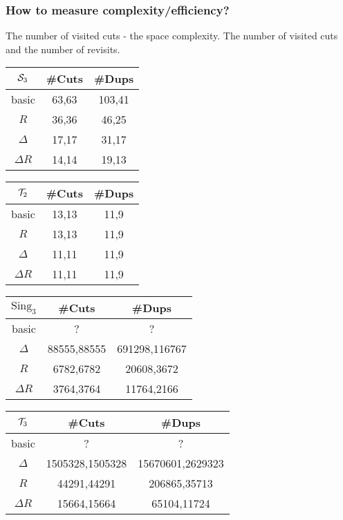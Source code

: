 \documentclass{beamer}
\newcommand{\cS}{{\cal S}}
\newcommand{\cT}{{\cal T}}
\newcommand{\jump}{\vskip6pt}
\begin{document}
\begin{frame}\frametitle{How to measure complexity/efficiency?}
The number of visited cuts - the space complexity.
\jump
The number of visited cuts and the number of revisits.
\jump
\begin{tabular}{c|cc}
$\cS_3$ & \#Cuts & \#Dups \\
\hline
basic  & 63,63 & 103,41\\
$R$ &36,36 & 46,25\\
$\Delta$ & 17,17 & 31,17 \\
$\Delta R$ & 14,14 & 19,13
\end{tabular}
\jump

\begin{tabular}{c|cc}
$\cT_2$ & \#Cuts & \#Dups \\
\hline
basic  & 13,13 & 11,9\\
$R$ &13,13 & 11,9\\
$\Delta$ & 11,11 & 11,9 \\
$\Delta R$ & 11,11 & 11,9
\end{tabular}
\end{frame}

\begin{frame}
\begin{tabular}{c|cc}
$\text{Sing}_3$ & \#Cuts & \#Dups \\
\hline
basic  & ? & ?\\
$\Delta$ & 88555,88555 & 691298,116767 \\
$R$ &6782,6782 & 20608,3672\\
$\Delta R$ & 3764,3764 & 11764,2166
\end{tabular}
\jump
\begin{tabular}{c|cc}
$\cT_3$ & \#Cuts & \#Dups \\
\hline
basic  & ? & ?\\
$\Delta$ & 1505328,1505328 & 15670601,2629323 \\
$R$ & 44291,44291 & 206865,35713\\
$\Delta R$ &15664,15664 & 65104,11724
\end{tabular}

\end{frame}
\end{document}
